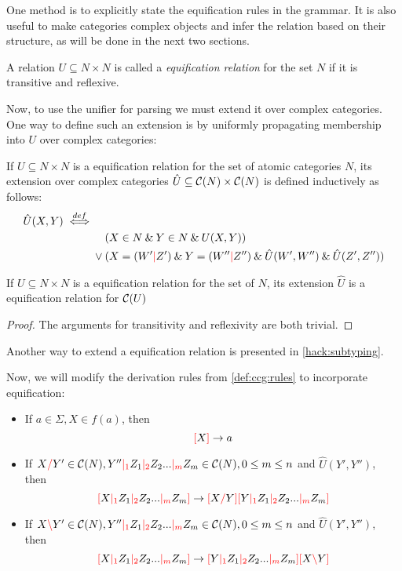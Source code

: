 \documentclass[main.tex]{subfiles}
\begin{document}
One method is to explicitly state the equification rules in the grammar.
It is also useful to make categories complex objects and infer the relation
based on their structure, as will be done in the next two sections.

\begin{defn}
    A relation $U \subseteq N \times N$ is called a
    \emph{equification relation} for the set $N$ if it is transitive
    and reflexive.
\end{defn}

Now, to use the unifier for parsing we must extend it over complex categories.
One way to define such an extension is by uniformly propagating membership
into $U$ over complex categories:
\begin{defn}\label{def:rel:uniform}
    If $U \subseteq N \times N$ is a equification relation
    for the set of
    atomic categories $N$, its extension over complex categories
    $\hat{U} \subseteq \mathcal{C}( N ) \times \mathcal{C}( N )$ is defined
    inductively as follows:
    \begin{align*}
        \hat{U}(X, Y) \defiff & \\
        & \phantom{{}\lor{}} (X \in N \land Y \in N \land U(X, Y)) \\
        & \lor (X = (W' \mc Z') \land Y = (W'' \mc Z'') \land \hat{U}(W', W'')
        \land \hat{U}(Z', Z'')) \\
    \end{align*}
\end{defn}

\begin{property}
    If $U \subseteq N \times N$ is a equification relation 
    for the set of
    $N$, its extension $\hat{U}$ is a equification relation for $\mathcal{C}( U )$
\end{property}
\begin{proof}
    The arguments for transitivity and reflexivity are both trivial.
\end{proof}

Another way to extend a equification relation is presented in \cref{hack:subtyping}.

Now, we will modify the derivation rules from \cref{def:ccg:rules} to incorporate
equification:
    
\begin{itemize}
    \item If $ a \in \Sigma, X \in f(a) $, then \[ \textcolor{red}{[} X \textcolor{red}{]} \rightarrow a \]
    \item If $ X \textcolor{red}{/} Y' \in \mathcal{C}( N ), Y'' \textcolor{red}{|_{1}} Z_1 \textcolor{red}{|_{2}} Z_2 ... \textcolor{red}{|_{m}} Z_m \in \mathcal{C}( N ), 0 \leq m \leq n $
        and $\hat{U}(Y', Y'')$, \\
        then \[ \textcolor{red}{[} X \textcolor{red}{|_{1}} Z_1 \textcolor{red}{|_{2}} Z_2 ... \textcolor{red}{|_{m}} Z_m \textcolor{red}{]} \rightarrow \textcolor{red}{[} X \textcolor{red}{/} Y \textcolor{red}{]} \textcolor{red}{[} Y \textcolor{red}{|_{1}} Z_1 \textcolor{red}{|_{2}} Z_2 ... \textcolor{red}{|_{m}} Z_m \textcolor{red}{]} \]
    \item If $ X \textcolor{red}{\backslash} Y' \in \mathcal{C}( N ), Y'' \textcolor{red}{|_{1}} Z_1 \textcolor{red}{|_{2}} Z_2 ... \textcolor{red}{|_{m}} Z_m \in \mathcal{C}( N ), 0 \leq m \leq n $
        and $\hat{U}(Y', Y'')$, \\
        then \[ \textcolor{red}{[} X \textcolor{red}{|_{1}} Z_1 \textcolor{red}{|_{2}} Z_2 ... \textcolor{red}{|_{m}} Z_m \textcolor{red}{]} \rightarrow \textcolor{red}{[} Y \textcolor{red}{|_{1}} Z_1 \textcolor{red}{|_{2}} Z_2 ... \textcolor{red}{|_{m}} Z_m \textcolor{red}{]} \textcolor{red}{[} X \textcolor{red}{\backslash} Y \textcolor{red}{]} \]
\end{itemize}
\end{document}
